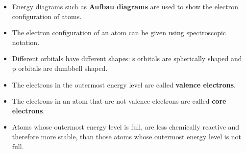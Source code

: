 \begin{itemize}[noitemsep]
\label{m38741*uid180}\item Energy diagrams such as \textbf{Aufbau diagrams} are used to show the electron configuration of atoms.
\item The electron configuration of an atom can be given using spectroscopic notation. 
\item Different orbitals have different shapes: s orbitals are spherically shaped and p orbitals are dumbbell shaped.
\label{m38741*uid181}\item The electrons in the outermost energy level are called \textbf{valence electrons}.
\label{m38741*uid182}\item The electrons in an atom that are not valence electrons are called \textbf{core electrons}.
\label{m38741*uid183}\item Atoms whose outermost energy level is full, are less chemically reactive and therefore more stable, than those atoms whose outermost energy level is not full.
\end{itemize}
% 
            

